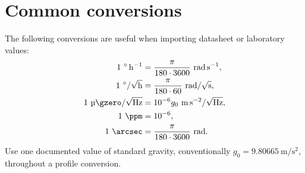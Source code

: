 \documentclass[11pt,oneside,headings=big]{scrreprt}
\begin{document}
    \section{Common conversions}
    The following conversions are useful when importing datasheet or laboratory
    values:
    \begin{align}
        1\ \si{\degree\per\hour}
        &=\frac{\pi}{180\cdot3600}\ \si{\radian\per\second},\\
        1\ \si{\degree}/\sqrt{\si{\hour}}
        &=\frac{\pi}{180\cdot60}\ \si{\radian}/\sqrt{\si{\second}},\\
        1\ \si{\micro\gzero}/\sqrt{\si{\hertz}}
        &=10^{-6}g_0\ \si{\meter\per\second\squared}/\sqrt{\si{\hertz}},\\
        1\ \si{\ppm}&=10^{-6},\\
        1\ \si{\arcsec}&=\frac{\pi}{180\cdot3600}\ \si{\radian}.
        \label{eq:unit-conversions}
    \end{align}
    Use one documented value of standard gravity, conventionally
    \(g_0=\SI{9.80665}{\meter\per\second\squared}\), throughout a profile conversion.
\end{document}
